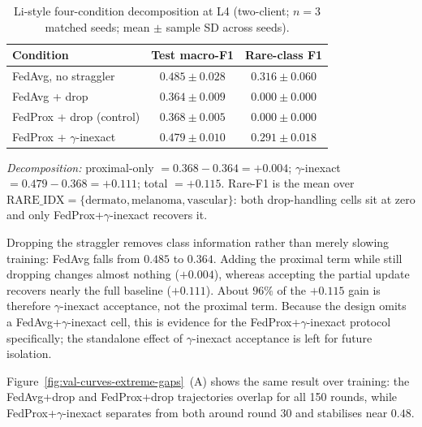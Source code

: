 \documentclass[11pt,a4paper]{report}
\begin{document}
\begin{table}[H]
\centering
\caption{Li-style four-condition decomposition at L4 (two-client; $n=3$
matched seeds; mean $\pm$ sample SD across seeds).}
\label{tab:li-decomp-l4}
\small
\begin{tabular}{lcc}
\toprule
Condition                                       & Test macro-F1                & Rare-class F1 \\
\midrule
FedAvg, no straggler                            & $0.485 \pm 0.028$            & $0.316 \pm 0.060$ \\
FedAvg + drop                                   & $0.364 \pm 0.009$            & $0.000 \pm 0.000$ \\
FedProx + drop (control)                        & $0.368 \pm 0.005$            & $0.000 \pm 0.000$ \\
FedProx + $\gamma$-inexact                      & $\mathbf{0.479 \pm 0.010}$   & $\mathbf{0.291 \pm 0.018}$ \\
\bottomrule
\end{tabular}

\smallskip
\noindent\textit{Decomposition:} proximal-only $= 0.368 - 0.364 = +0.004$;
$\gamma$-inexact $= 0.479 - 0.368 = +0.111$; total $= +0.115$. Rare-F1 is
the mean over $\mathrm{RARE\_IDX} = \{\text{dermato}, \text{melanoma},
\text{vascular}\}$: both drop-handling cells sit at zero and only
FedProx+$\gamma$-inexact recovers it.
\end{table}

Dropping the straggler removes class information rather than merely slowing
training: FedAvg falls from $0.485$ to $0.364$. Adding the proximal term while
still dropping changes almost nothing ($+0.004$), whereas accepting the partial
update recovers nearly the full baseline ($+0.111$). About $96\%$ of the $+0.115$
gain is therefore $\gamma$-inexact acceptance, not the proximal term. Because the
design omits a FedAvg+$\gamma$-inexact cell, this is evidence for the
FedProx+$\gamma$-inexact protocol specifically; the standalone effect of
$\gamma$-inexact acceptance is left for future isolation.

Figure~\ref{fig:val-curves-extreme-gaps}~(A) shows the same result over
training: the FedAvg+drop and FedProx+drop trajectories overlap for all 150
rounds, while FedProx+$\gamma$-inexact separates from both around round 30 and
stabilises near $0.48$.
\end{document}
